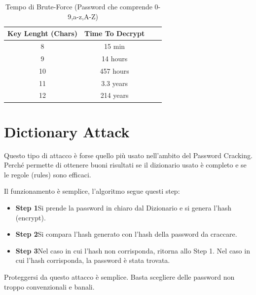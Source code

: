 \begin{table}[h]
    \centering
    \begin{tabular}{ |c|c|c|c| }
        \hline
        Key Lenght (Chars) & Time To Decrypt \\
        \hline
        8                  & 15 min          \\
        \hline
        9                  & 14 hours        \\
        \hline
        10                 & 457 hours       \\
        \hline
        11                 & 3.3 years       \\
        \hline
        12                 & 214 years       \\
        \hline
    \end{tabular}
    \label{fig:brute}
    \caption{Tempo di Brute-Force (Password che comprende 0-9,a-z,A-Z)\cite{hashcrack}}
\end{table}

\newpage

\section{Dictionary Attack}
Questo tipo di attacco \cite{Dictionary_attack} è forse quello più usato nell’ambito del Password Cracking. Perché permette di ottenere buoni risultati se il dizionario usato è completo e se le regole (rules) sono efficaci.

Il funzionamento è semplice, l’algoritmo segue questi step:
\begin{itemize}
    \item \textbf{Step 1}\newline Si prende la password in chiaro dal Dizionario e si genera l’hash (encrypt).
    \item \textbf{Step 2}\newline Si compara l’hash generato con l’hash della password da craccare.
    \item \textbf{Step 3}\newline Nel caso in cui l’hash non corrisponda, ritorna allo Step 1. \newline Nel caso in cui l’hash corrisponda, la password è stata trovata.
\end{itemize}

Proteggersi da questo attacco è semplice. Basta scegliere delle password non troppo convenzionali e banali.

